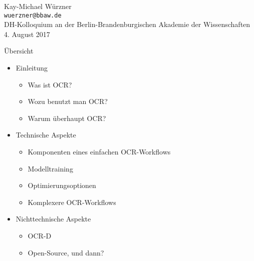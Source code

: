 \documentclass{bbawslides}
\begin{document}
\providecommand{\Title}{}


\begin{bbawtitle}
  \vspace*{3em}%
  Kay-Michael Würzner\\[-.25em]%
  \textcolor{urlColor}{\texttt{{\small wuerzner@bbaw.de}}}
  \\[3em]
  {\footnotesize{%
    DH-Kolloquium an der Berlin-Brandenburgischen Akademie der Wissenschaften\\%
    4. August 2017\\%
  }}
\end{bbawtitle}
\slideStyleFrame

\renewcommand{\footerText}{\tiny 4. August 2017, DH-Kolloquium, BBAW}

\begin{bbawslide}{Übersicht}
  \vspace*{7mm}%
  \centerslidestrue%
  \begin{itemize}
    \item Einleitung
    \begin{itemize}\small
      \item Was ist OCR?
      \item Wozu benutzt man OCR?
      \item Warum überhaupt OCR?
    \end{itemize}
    \item Technische Aspekte
    \begin{itemize}\small
      \item Komponenten eines einfachen OCR-Workflows
      \item Modelltraining
      \item Optimierungsoptionen
      \item Komplexere OCR-Workflows
    \end{itemize}
    \item Nichttechnische Aspekte
    \begin{itemize}\small
      \item OCR-D
      \item Open-Source, und dann?
    \end{itemize}
  \end{itemize}
\end{bbawslide}
\end{document}
